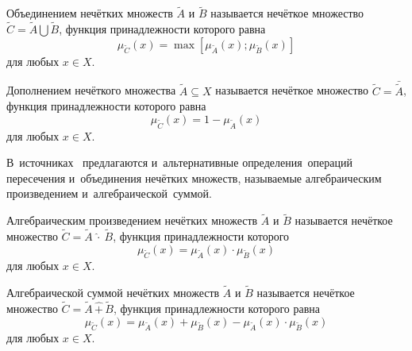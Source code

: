 \begin{mydef}
Объединением нечётких множеств $\tilde{A}$ и $\tilde{B}$ называется нечёткое множество $\displaystyle \tilde{C}=\tilde{A}\bigcup \tilde{B}$, функция принадлежности которого равна
\begin{equation}
\label{eq:fuzzy-union}
	{{\mu }_{{\tilde{C}}}}\left( x \right)=\max \left[ {{\mu }_{{\tilde{A}}}}\left( x \right);{{\mu }_{{\tilde{B}}}}\left( x \right) \right]
\end{equation}
для любых $x\in X$.
\end{mydef}

\begin{mydef}
Дополнением нечёткого множества $\tilde{A}\subseteq X$ называется нечёткое множество $\displaystyle \tilde{C}=\bar{\tilde{A}}$, функция принадлежности которого равна
\begin{equation}
\label{eq:fuzzy-minus}
	{{\mu }_{{\tilde{C}}}}\left( x \right)=1-{{\mu }_{{\tilde{A}}}}\left( x \right)
\end{equation}
для любых $x\in X$.
\end{mydef}

В~источниках~\cite{Ryzhov, Borisov_Krumberg_Riga, Kaufmann, Ukhobotov_Book} предлагаются и~альтернативные определения~операций пересечения и~объединения нечётких множеств, называемые алгебраическим произведением и~алгебраической~суммой.
\begin{mydef}
Алгебраическим произведением нечётких множеств $\tilde{A}$ и $\tilde{B}$ называется нечёткое множество $\displaystyle \tilde{C}=\tilde{A}\ \widehat{\cdot}\ \tilde{B}$, функция принадлежности которого
\begin{equation}
\label{eq:fuzzy-cross-mult}
	\mu_{\tilde C} \left( x \right)=\mu_{\tilde A}\left( x \right) \cdot \mu_{\tilde B}\left( x \right)
\end{equation}
для любых $x\in X$.
\end{mydef}

\begin{mydef}
Алгебраической суммой нечётких множеств $\tilde{A}$ и $\tilde{B}$ называется нечёткое множество $\displaystyle \tilde{C}=\tilde{A}\, \widehat{+}\, \tilde{B}$, функция принадлежности которого равна
\begin{equation}
\label{eq:fuzzy-union-summ}
		\mu_{\tilde C} \left( x \right)=\mu_{\tilde A}\left( x \right) + \mu_{\tilde B}\left( x \right) - \mu_{\tilde A}\left( x \right) \cdot \mu_{\tilde B}\left( x \right)
\end{equation}
для любых $x\in X$.
\end{mydef} 

